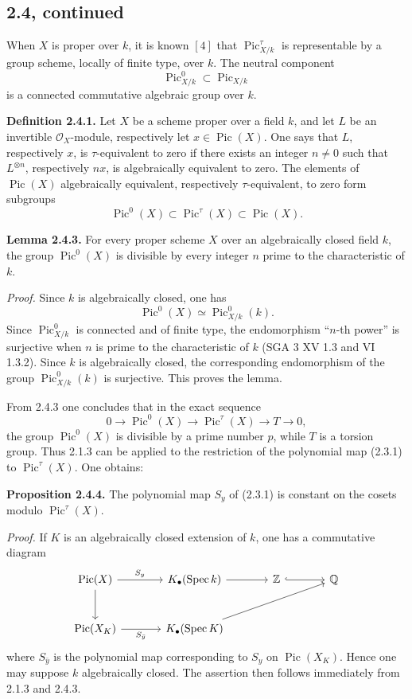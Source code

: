 \documentclass[11pt]{article}
\newcommand{\Spec}{\operatorname{Spec}}
\providecommand{\Pic}{\operatorname{Pic}}
\begin{document}
\subsection*{2.4, continued}

When \(X\) is proper over \(k\), it is known \([4]\) that \(\Pic_{X/k}^{\tau}\) is representable by a group scheme, locally of finite type, over \(k\). The neutral component
\[
 \Pic^0_{X/k}\subset \Pic_{X/k}
\]
is a connected commutative algebraic group over \(k\).

\textbf{Definition 2.4.1.} Let \(X\) be a scheme proper over a field \(k\), and let \(L\) be an invertible \(\mathcal O_X\)-module, respectively let \(x\in \Pic(X)\). One says that \(L\), respectively \(x\), is \(\tau\)-equivalent to zero if there exists an integer \(n\ne0\) such that \(L^{\otimes n}\), respectively \(nx\), is algebraically equivalent to zero. The elements of \(\Pic(X)\) algebraically equivalent, respectively \(\tau\)-equivalent, to zero form subgroups
\[
 \Pic^0(X)\subset \Pic^\tau(X)\subset \Pic(X).
\]

\textbf{Lemma 2.4.3.} For every proper scheme \(X\) over an algebraically closed field \(k\), the group \(\Pic^0(X)\) is divisible by every integer \(n\) prime to the characteristic of \(k\).

\emph{Proof.} Since \(k\) is algebraically closed, one has
\[
 \Pic^0(X)\simeq \Pic^0_{X/k}(k).
\]
Since \(\Pic^0_{X/k}\) is connected and of finite type, the endomorphism ``\(n\)-th power'' is surjective when \(n\) is prime to the characteristic of \(k\) (SGA 3 XV 1.3 and VI 1.3.2). Since \(k\) is algebraically closed, the corresponding endomorphism of the group \(\Pic^0_{X/k}(k)\) is surjective. This proves the lemma.

From 2.4.3 one concludes that in the exact sequence
\[
 0\longrightarrow\Pic^0(X)\longrightarrow\Pic^\tau(X)\longrightarrow T\longrightarrow0,
\]
the group \(\Pic^0(X)\) is divisible by a prime number \(p\), while \(T\) is a torsion group. Thus 2.1.3 can be applied to the restriction of the polynomial map (2.3.1) to \(\Pic^\tau(X)\). One obtains:

\textbf{Proposition 2.4.4.} The polynomial map \(S_y\) of (2.3.1) is constant on the cosets modulo \(\Pic^\tau(X)\).

\emph{Proof.} If \(K\) is an algebraically closed extension of \(k\), one has a commutative diagram
\[
\begin{tikzcd}[column sep=large,row sep=large]
\Pic(X) \arrow[r,"S_y"] \arrow[d] &
K_\bullet(\Spec k) \arrow[r] &
\mathbb Z \arrow[r,hook] & \mathbb Q\\
\Pic(X_K) \arrow[r,"S_{\bar y}"'] &
K_\bullet(\Spec K) \arrow[urr] &&
\end{tikzcd}
\]
where \(S_{\bar y}\) is the polynomial map corresponding to \(S_y\) on \(\Pic(X_K)\). Hence one may suppose \(k\) algebraically closed. The assertion then follows immediately from 2.1.3 and 2.4.3.
\end{document}
